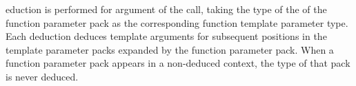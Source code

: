 \documentclass{wg21}
\begin{document}
eduction is performed for  argument of the call,
taking the type 
of the  of the function parameter pack
as the corresponding function template parameter type.
Each deduction deduces template arguments for subsequent positions in
the template parameter packs expanded by the function parameter pack.
When a function parameter pack appears in a non-deduced
context, the type of that pack is
never deduced.


%
\end{document}

